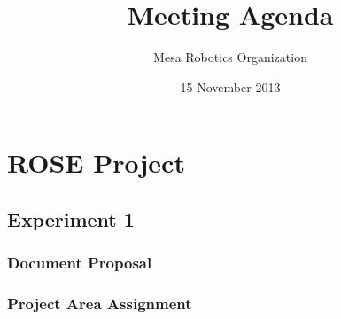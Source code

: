 \documentclass{article}
\begin{document}

\title{Meeting Agenda}
\author{Mesa Robotics Organization}
\date{15 November 2013}

\maketitle

\section{ROSE Project}
\subsection{Experiment 1}
\subsubsection{Document Proposal}
\subsubsection{Project Area Assignment}

\end{document}
